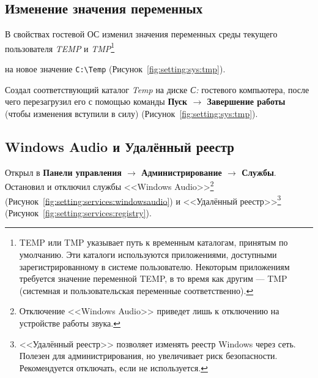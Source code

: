 \subsection{Изменение значения переменных}

В свойствах гостевой ОС изменил значения переменных среды
текущего пользователя \textit{TEMP}
и \textit{TMP}\footnote{
TEMP или TMP указывает путь к временным каталогам, принятым по умолчанию.
Эти каталоги используются приложениями,
доступными зарегистрированному в системе пользователю.
Некоторым приложениям требуется значение переменной TEMP,
в то время как другим --- TMP
(системная и пользовательская переменные соответственно).
}

на новое значение \verb|C:\Temp| (Рисунок~\ref{fig:setting:sys:tmp}).

\begin{image}
	\caption{Изменение значения переменных среды}
	\label{fig:setting:sys:tmp}
\end{image}

Создал соответствующий каталог \textit{Temp}
на диске \textit{С:} гостевого компьютера, после
чего перезагрузил его с помощью команды
\textbf{Пуск $\rightarrow$ Завершение работы}
(чтобы изменения вступили в силу) (Рисунок~\ref{fig:setting:sys:tmp}).

\begin{image}
	\caption{Создание каталога \textit{Temp} на \textit{C:}}
	\label{fig:setting:sys:tmp}
\end{image}

\subsection{Windows Audio и Удалённый реестр}

Открыл в \textbf{Панели управления
$\rightarrow$ Администрирование $\rightarrow$ Службы}.
Остановил и отключил службы <<Windows Audio>>\footnote{
Отключение <<Windows Audio>> приведет лишь к отключению 
на устройстве работы звука.
} (Рисунок~\ref{fig:setting:services:windowsaudio})
и <<Удалённый реестр>>\footnote{
<<Удалённый реестр>> позволяет изменять реестр Windows через сеть.
Полезен для администрирования, но увеличивает риск безопасности.
Рекомендуется отключать, если не используется.
} (Рисунок~\ref{fig:setting:services:registry}).

\begin{image}
	\caption{Отключил Windows Audio}
	\label{fig:setting:services:windowsaudio}
\end{image}


